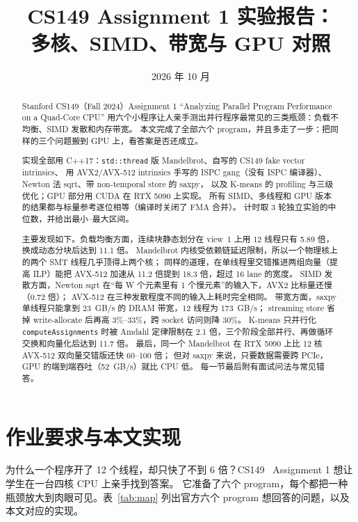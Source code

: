 \documentclass[11pt,a4paper]{ctexart}
\title{CS149 Assignment 1 实验报告：\\多核、SIMD、带宽与 GPU 对照}
\author{\authorline}
\date{2026 年 10 月}
\begin{document}
\maketitle

\begin{abstract}
Stanford CS149（Fall 2024）Assignment 1 ``Analyzing Parallel Program Performance on a Quad-Core CPU''
用六个小程序让人亲手测出并行程序最常见的三类瓶颈：负载不均衡、SIMD 发散和内存带宽。
本文完成了全部六个 program，并且多走了一步：把同样的三个问题搬到 GPU 上，看答案是否还成立。

实现全部用 C++17：\texttt{std::thread} 版 Mandelbrot、自写的 CS149 fake vector intrinsics、
用 AVX2/AVX-512 intrinsics 手写的 ISPC gang（没有 ISPC 编译器）、Newton 法 sqrt、带 non-temporal store 的 saxpy，
以及 K-means 的 profiling 与三级优化；GPU 部分用 CUDA 在 RTX 5090 上实现。
所有 SIMD、多线程和 GPU 版本的结果都与标量参考逐位相等（编译时关闭了 FMA 合并）。
计时取 3 轮独立实验的中位数，并给出最小--最大区间。

主要发现如下。负载均衡方面，连续块静态划分在 view~1 上用 12 线程只有 5.89 倍，换成动态分块后达到 11.1 倍。
Mandelbrot 内核受依赖链延迟限制，所以一个物理核上的两个 SMT 线程几乎顶得上两个核；
同样的道理，在单线程里交错推进两组向量（提高 ILP）能把 AVX-512 加速从 11.2 倍提到 18.3 倍，超过 16 lane 的宽度。
SIMD 发散方面，Newton sqrt 在``每 W 个元素里有 1 个慢元素''的输入下，AVX2 比标量还慢（0.72 倍）；
AVX-512 在三种发散程度不同的输入上耗时完全相同。
带宽方面，saxpy 单线程只能拿到 23~GB/s 的 DRAM 带宽，12 线程为 173~GB/s；
streaming store 省掉 write-allocate 后再高 3\%--33\%，跨 socket 访问则降 30\%。
K-means 只并行化 \texttt{computeAssignments} 时被 Amdahl 定律限制在 2.1 倍，三个阶段全部并行、再做循环交换和向量化后达到 11.7 倍。
最后，同一个 Mandelbrot 在 RTX 5090 上比 12 核 AVX-512 双向量交错版还快 60--100 倍；
但对 saxpy 来说，只要数据需要跨 PCIe，GPU 的端到端吞吐（52~GB/s）就比 CPU 低。
每一节最后附有面试问法与常见错答。
\end{abstract}

\tableofcontents
\newpage

\section{作业要求与本文实现}
\label{sec:intro}

为什么一个程序开了 12 个线程，却只快了不到 6 倍？CS149~\cite{cs149} Assignment 1 想让学生在一台四核 CPU 上亲手找到答案。
它准备了六个 program，每个都把一种瓶颈放大到肉眼可见。表~\ref{tab:map} 列出官方六个 program 想回答的问题，以及本文对应的实现。
\end{document}
